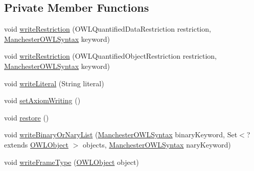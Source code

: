 \subsection*{Private Member Functions}
\begin{DoxyCompactItemize}
\item 
void \hyperlink{classuk_1_1ac_1_1manchester_1_1cs_1_1owl_1_1owlapi_1_1mansyntaxrenderer_1_1_manchester_o_w_l_syntax_object_renderer_a7453c8edc3fc586e00df16585e97b420}{write\-Restriction} (O\-W\-L\-Quantified\-Data\-Restriction restriction, \hyperlink{enumorg_1_1coode_1_1owlapi_1_1manchesterowlsyntax_1_1_manchester_o_w_l_syntax}{Manchester\-O\-W\-L\-Syntax} keyword)
\item 
void \hyperlink{classuk_1_1ac_1_1manchester_1_1cs_1_1owl_1_1owlapi_1_1mansyntaxrenderer_1_1_manchester_o_w_l_syntax_object_renderer_af17abab4e2fc559edb6ab45723f10654}{write\-Restriction} (O\-W\-L\-Quantified\-Object\-Restriction restriction, \hyperlink{enumorg_1_1coode_1_1owlapi_1_1manchesterowlsyntax_1_1_manchester_o_w_l_syntax}{Manchester\-O\-W\-L\-Syntax} keyword)
\item 
void \hyperlink{classuk_1_1ac_1_1manchester_1_1cs_1_1owl_1_1owlapi_1_1mansyntaxrenderer_1_1_manchester_o_w_l_syntax_object_renderer_a36e1fbd271012ecb4a3ae5e2f88e3e01}{write\-Literal} (String literal)
\item 
void \hyperlink{classuk_1_1ac_1_1manchester_1_1cs_1_1owl_1_1owlapi_1_1mansyntaxrenderer_1_1_manchester_o_w_l_syntax_object_renderer_abb17a2c4db34f010ffe93fd3fbabd000}{set\-Axiom\-Writing} ()
\item 
void \hyperlink{classuk_1_1ac_1_1manchester_1_1cs_1_1owl_1_1owlapi_1_1mansyntaxrenderer_1_1_manchester_o_w_l_syntax_object_renderer_ad5c5e0e2f5b3a4d6f2ee80f9cc9a200f}{restore} ()
\item 
void \hyperlink{classuk_1_1ac_1_1manchester_1_1cs_1_1owl_1_1owlapi_1_1mansyntaxrenderer_1_1_manchester_o_w_l_syntax_object_renderer_a244abb8a18fb924b2678e7fb53eb0df0}{write\-Binary\-Or\-Nary\-List} (\hyperlink{enumorg_1_1coode_1_1owlapi_1_1manchesterowlsyntax_1_1_manchester_o_w_l_syntax}{Manchester\-O\-W\-L\-Syntax} binary\-Keyword, Set$<$?extends \hyperlink{interfaceorg_1_1semanticweb_1_1owlapi_1_1model_1_1_o_w_l_object}{O\-W\-L\-Object} $>$ objects, \hyperlink{enumorg_1_1coode_1_1owlapi_1_1manchesterowlsyntax_1_1_manchester_o_w_l_syntax}{Manchester\-O\-W\-L\-Syntax} nary\-Keyword)
\item 
void \hyperlink{classuk_1_1ac_1_1manchester_1_1cs_1_1owl_1_1owlapi_1_1mansyntaxrenderer_1_1_manchester_o_w_l_syntax_object_renderer_a907a6bcf7ab663b15de3efdf2dd4da9a}{write\-Frame\-Type} (\hyperlink{interfaceorg_1_1semanticweb_1_1owlapi_1_1model_1_1_o_w_l_object}{O\-W\-L\-Object} object)
\end{DoxyCompactItemize}
